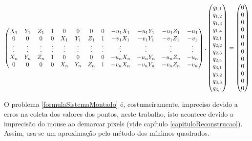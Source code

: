 	\begin{equation}
		\label{formulaSistemaMontado}
		\setcounter{MaxMatrixCols}{20}
		\begin{pmatrix}
			X_{1} & Y_{1} & Z_{1} & 1 & 0 & 0 & 0 & 0 & -u_{1}X_{1} & -u_{1}Y_{1} & -u_{1}Z_{1} & -u_{1} \\
			0 & 0 & 0 & 0 & X_{1} & Y_{1} & Z_{1} & 1 & -v_{1}X_{1} & -v_{1}Y_{1} & -v_{1}Z_{1} & -v_{1} \\
			\vdots & \vdots & \vdots & \vdots & \vdots & \vdots & \vdots & \vdots & \vdots & \vdots & \vdots & \vdots \\
			X_{n} & Y_{n} & Z_{n} & 1 & 0 & 0 & 0 & 0 & -u_{n}X_{n} & -u_{n}Y_{n} & -u_{n}Z_{n} & -u_{n} \\
			0 & 0 & 0 & 0 & X_{n} & Y_{n} & Z_{n} & 1 & -v_{n}X_{n} & -v_{n}Y_{n} & -v_{n}Z_{n} & -v_{n}	
		\end{pmatrix}
		.
		\begin{pmatrix}
			q_{1,1} \\
			q_{1,2} \\
			q_{1,3} \\
			q_{1,4} \\
			q_{2,1} \\
			q_{2,2} \\
			q_{2,3} \\
			q_{2,4} \\
			q_{3,1} \\
			q_{3,2} \\
			q_{3,3} \\
			q_{3,4} \\
		\end{pmatrix}
		=
		\begin{pmatrix}
			0 \\
			0 \\
			0 \\
			0 \\
			0 \\
			0 \\
			0 \\
			0 \\
			0 \\
			0 \\
			0 \\
			0 \\
		\end{pmatrix}
	\end{equation}
	
	O problema \ref{formulaSistemaMontado} é, costumeiramente, impreciso devido a erros na coleta dos valores dos pontos, neste trabalho, isto acontece devido a imprecisão do mouse ao demarcar pixels (vide capítulo \ref{capituloReconstrucao}). Assim, usa-se um aproximação pelo método dos mínimos quadrados.
	
